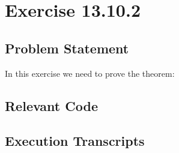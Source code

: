 \documentclass{report}
\begin{document}

 \chapter{Exercise 13.10.2}
 \label{cha:exercise-13.10.2}
  
 \section{Problem Statement}
 \label{sec:problem-statement-2}

In this exercise we need to prove the theorem:
\HOLsolutionsOneTheoremsaclExerciseTwo
\HOLsolutionsOneTheoremsaclExerciseTwoA
\HOLsolutionsOneTheoremsaclExerciseTwoB

\section{Relevant Code}
\label{sec:relevant-code-2}




\section{Execution Transcripts}
\label{sec:exec-transcr-2}
\end{document}
